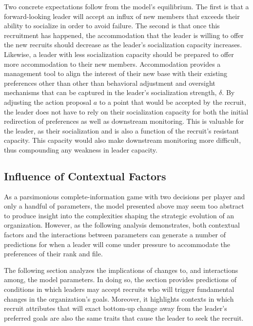 Two concrete expectations follow from the model's equilibrium. The first is that a forward-looking leader will accept an influx of new members that exceeds their ability to socialize in order to avoid failure. The second is that once this recruitment has happened, the accommodation that the leader is willing to offer the new recruits should decrease as the leader's socialization capacity increases.  Likewise, a leader with less socialization capacity should be prepared to offer more accommodation to their new members. Accommodation provides a management tool to align the interest of their new base with their existing preferences other than other than behavioral adjustment and oversight mechanisms that can be captured in the leader's socialization strength, $\delta$. By adjusting the action proposal $a$ to a point that would be accepted by the recruit, the leader does not have to rely on their socialization capacity for both the initial redirection of preferences as well as downstream monitoring. This is valuable for the leader, as their socialization and  is also a function of the recruit's resistant capacity. This capacity would also make downstream monitoring more difficult, thus compounding any weakness in leader capacity.


\subsection{Influence of Contextual Factors} %

As a parsimonious complete-information game with two decisions per player and only a handful of parameters, the model presented above may seem too abstract to produce insight into the complexities shaping the strategic evolution of an organization. However, as the following analysis demonstrates, both contextual factors and the interactions between parameters can generate a number of predictions for when a leader will come under pressure to accommodate the preferences of their rank and file.

 The following section analyzes the implications of changes to, and interactions among, the model parameters. In doing so, the section provides predictions of conditions in which leaders may accept recruits who will trigger fundamental changes in the organization's goals. Moreover, it highlights contexts in which recruit attributes that will exact bottom-up change away from the leader's preferred goals are also the same traits that cause the leader to seek the recruit.


